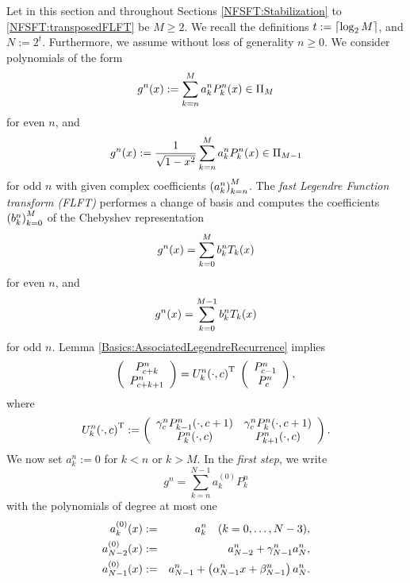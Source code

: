 Let in this section and throughout Sections \ref{NFSFT:Stabilization} to 
\ref {NFSFT:transposedFLFT} be $M \ge 2$. We recall the definitions 
$t := \left\lceil\log_{2}M\right\rceil$, and $N := 2^t$. Furthermore, we assume without loss of generality $n \ge 0$.
We consider polynomials of the form
\begin{equation}
  \label{NFSFT:GnEven}
 g^n{\hspace{-0.4ex}}\left(x\right) := \sum_{k=n}^M a_k^n P_k^n{\hspace{-0.4ex}}\left(x\right) \in \Pi_M
 \end{equation}
for even $n$, and
\begin{equation}
  \label{NFSFT:GnOdd}
  g^n{\hspace{-0.4ex}}\left(x\right) := \frac{1}{\sqrt{1-x^2}} \sum_{k=n}^M a_k^n P_k^n{\hspace{-0.4ex}}\left(x\right) \in \Pi_{M-1}
\end{equation}
for odd $n$ with given complex coefficients $\left(a_k^n\right)_{k=n}^M$.
The \emph{fast Legendre Function transform (FLFT)} performes a change of basis and computes the 
coefficients $\left(b_k^n\right)_{k=0}^M$ of the Chebyshev representation
\[ g^n{\hspace{-0.4ex}}\left(x\right) = \sum_{k=0}^M b_k^n T_k{\hspace{-0.4ex}}\left(x\right)\]
for even $n$, and
\[g^n{\hspace{-0.4ex}}\left(x\right) = \sum_{k=0}^{M-1} b_k^n T_k{\hspace{-0.4ex}}\left(x\right)\]
for odd $n$.
Lemma \ref{Basics:AssociatedLegendreRecurrence} implies
\begin{equation}
  \label{NFSFT:U}
  \left(\begin{array}{c}
    P_{c+k}^{n} \\ P_{c+k+1}^{n}
  \end{array}\right)
  =
  U_{k}^{n}{\hspace{-0.4ex}}\left(\cdot,c\right)^{\text{\rm{T}}}\;
  \left(\begin{array}{c}
    P_{c-1}^{n} \\ P_{c}^{n}
  \end{array}\right),
\end{equation}
where
\[
  U_{k}^{n}{\hspace{-0.4ex}}\left(\cdot,c\right)^{\text{\rm{T}}} :=
  \left(\begin{array}{cc}
    \gamma_c^{n} P_{k-1}^{n}{\hspace{-0.4ex}}\left(\cdot,c+1\right) & \gamma_c^{n} P_{k}^{n}{\hspace{-0.4ex}}\left(\cdot,c+1\right) \\
                 P_{k}^{n}{\hspace{-0.4ex}}\left(\cdot,c\right)     &              P_{k+1}^{n}{\hspace{-0.4ex}}\left(\cdot,c\right)
  \end{array}\right).   
\]
We now set $a_k^n := 0$ for $k < n$ or $k > M$. In the \emph{first step}, we write
\begin{equation} 
  \label{NFSFT:StepZero}
  g^n = \sum_{k = n}^{N-1} a_{k}^{(0)} P_k^{n}
\end{equation}
with the polynomials of degree at most one
\begin{eqnarray*}
  a_k^{(0)}{\hspace{-0.4ex}}\left(x\right)     & := & a_k^n \quad (k = 0,\ldots,N-3),\\
  a_{N-2}^{(0)}{\hspace{-0.4ex}}\left(x\right) & := & a_{N-2}^n + \gamma_{N-1}^{n} a_N^n,\\
  a_{N-1}^{(0)}{\hspace{-0.4ex}}\left(x\right) & := & a_{N-1}^n + \left(\alpha_{N-1}^{n}x + \beta_{N-1}^{n}\right) a_N^n.
\end{eqnarray*}
